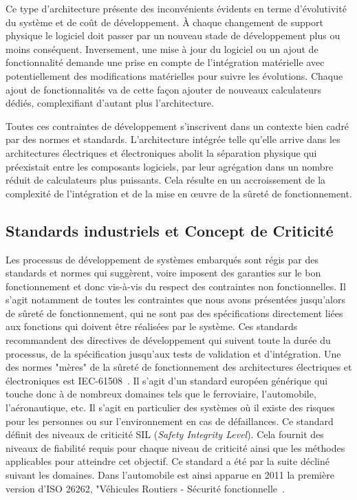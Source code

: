 \documentclass[french, a4paper, 11pt, twoside, pdftex]{StyleThese}
\begin{document}
		Ce type d'architecture présente des inconvénients évidents en terme d'évolutivité du système et de coût de développement. À chaque changement de support physique le logiciel doit passer par un nouveau stade de développement plus ou moins conséquent. Inversement, une mise à jour du logiciel ou un ajout de fonctionnalité demande une prise en compte de l'intégration matérielle avec potentiellement des modifications matérielles pour suivre les évolutions. Chaque ajout de fonctionnalités va de cette façon ajouter de nouveaux calculateurs dédiés, complexifiant d'autant plus l'architecture.
		
		Toutes ces contraintes de développement s'inscrivent dans un contexte bien cadré par des normes et standards. L’architecture intégrée telle qu'elle arrive dans les architectures électriques et électroniques abolit la séparation physique qui préexistait entre les composants logiciels, par leur agrégation dans un nombre réduit de calculateurs plus puissants. Cela résulte en un accroissement de la complexité de l’intégration et de la mise en œuvre de la sûreté de fonctionnement. 
	
		\subsection{Standards industriels et Concept de Criticité}	
		Les processus de développement de systèmes embarqués sont régis par des standards et normes qui suggèrent, voire imposent des garanties sur le bon fonctionnement et donc vis-à-vis du respect des contraintes non fonctionnelles. Il s'agit notamment de toutes les contraintes que nous avons présentées jusqu'alors de sûreté de fonctionnement, qui ne sont pas des spécifications directement liées aux fonctions qui doivent être réalisées par le système. Ces standards recommandent des directives de développement qui suivent toute la durée du processus, de la spécification jusqu'aux tests de validation et d'intégration. Une des normes "mères" de la sûreté de fonctionnement des architectures électriques et électroniques est IEC-61508~\cite{iec61508}. Il s'agit d'un standard européen générique qui touche donc à de nombreux domaines tels que le ferroviaire, l'automobile, l'aéronautique, etc. Il s'agit en particulier des systèmes où il existe des risques pour les personnes ou sur l'environnement en cas de défaillances. Ce standard définit des niveaux de criticité SIL (\textit{Safety Integrity Level}). Cela fournit des niveaux de fiabilité requis pour chaque niveau de criticité ainsi que les méthodes applicables pour atteindre cet objectif. Ce standard a été par la suite décliné suivant les domaines. Dans l'automobile est ainsi apparue en 2011 la première version d'ISO 26262, "Véhicules Routiers - Sécurité fonctionnelle~\cite{iso_tc22sc3wg16_iso_2011}. 
\end{document}
